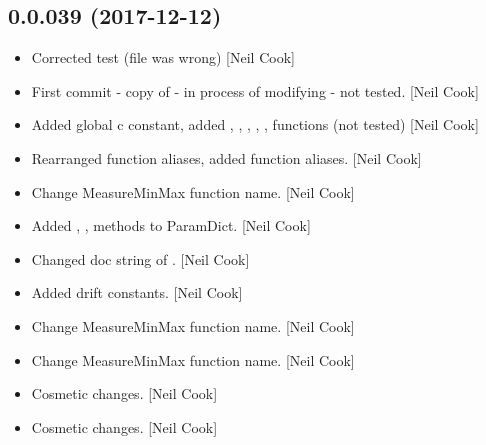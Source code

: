 \documentclass[a4paper,10pt,english]{report}
\begin{document}
\subsection{0.0.039 (2017-12-12)}
\label{\detokenize{misc/changelog:id513}}\begin{itemize}
\item {} 
Corrected  test (file was wrong) {[}Neil Cook{]}

\item {} 
First commit - copy of  - in process of modifying - not
tested. {[}Neil Cook{]}

\item {} 
Added global c constant, added , ,
, , , 
functions (not tested) {[}Neil Cook{]}

\item {} 
Rearranged function aliases, added  function aliases. {[}Neil
Cook{]}

\item {} 
Change MeasureMinMax function name. {[}Neil Cook{]}

\item {} 
Added , ,  methods to ParamDict.
{[}Neil Cook{]}

\item {} 
Changed doc string of . {[}Neil Cook{]}

\item {} 
Added drift constants. {[}Neil Cook{]}

\item {} 
Change MeasureMinMax function name. {[}Neil Cook{]}

\item {} 
Change MeasureMinMax function name. {[}Neil Cook{]}

\item {} 
Cosmetic changes. {[}Neil Cook{]}

\item {} 
Cosmetic changes. {[}Neil Cook{]}

\end{itemize}
\end{document}
